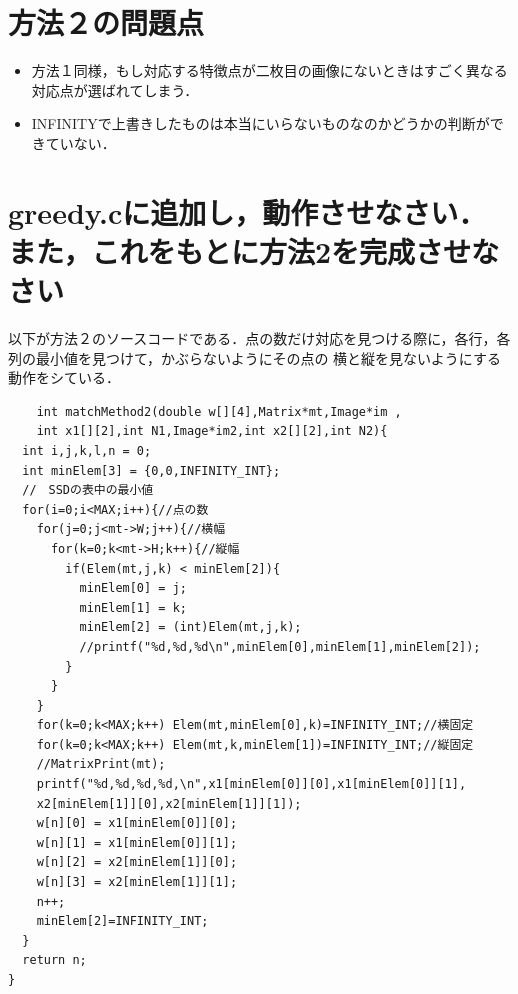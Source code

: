 \documentclass[11pt]{jarticle}
\begin{document}
\section{方法２の問題点}
\begin{itemize}
    \item 方法１同様，もし対応する特徴点が二枚目の画像にないときはすごく異なる対応点が選ばれてしまう．
    \item INFINITYで上書きしたものは本当にいらないものなのかどうかの判断ができていない．
  \end{itemize}

\section{greedy.cに追加し，動作させなさい．また，これをもとに方法2を完成させなさい}
以下が方法２のソースコードである．点の数だけ対応を見つける際に，各行，各列の最小値を見つけて，かぶらないようにその点の
横と縦を見ないようにする動作をシている．
\begin{verbatim}
    int matchMethod2(double w[][4],Matrix*mt,Image*im ,
    int x1[][2],int N1,Image*im2,int x2[][2],int N2){
  int i,j,k,l,n = 0;
  int minElem[3] = {0,0,INFINITY_INT};
  //　SSDの表中の最小値
  for(i=0;i<MAX;i++){//点の数
    for(j=0;j<mt->W;j++){//横幅
      for(k=0;k<mt->H;k++){//縦幅
        if(Elem(mt,j,k) < minElem[2]){
          minElem[0] = j;
          minElem[1] = k;
          minElem[2] = (int)Elem(mt,j,k);
          //printf("%d,%d,%d\n",minElem[0],minElem[1],minElem[2]);
        }
      }
    }
    for(k=0;k<MAX;k++) Elem(mt,minElem[0],k)=INFINITY_INT;//横固定
    for(k=0;k<MAX;k++) Elem(mt,k,minElem[1])=INFINITY_INT;//縦固定
    //MatrixPrint(mt);
    printf("%d,%d,%d,%d,\n",x1[minElem[0]][0],x1[minElem[0]][1],
    x2[minElem[1]][0],x2[minElem[1]][1]);
    w[n][0] = x1[minElem[0]][0];
    w[n][1] = x1[minElem[0]][1];
    w[n][2] = x2[minElem[1]][0];
    w[n][3] = x2[minElem[1]][1];
    n++;
    minElem[2]=INFINITY_INT;
  }
  return n;
}
\end{verbatim}
\end{document}
